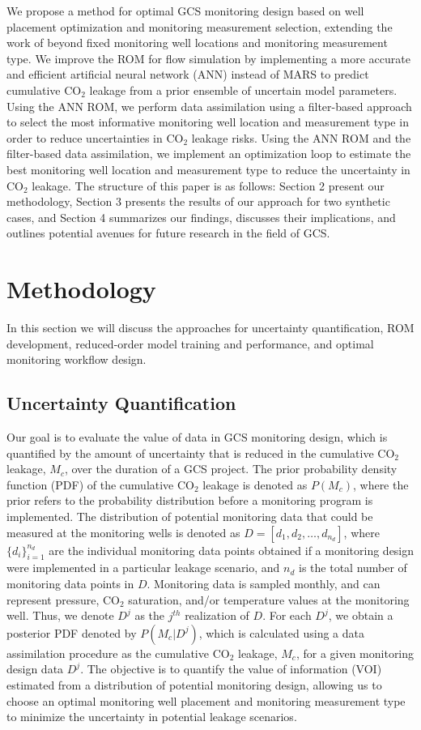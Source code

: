 \documentclass[a4paper,fleqn]{cas-sc}
\begin{document}
We propose a method for optimal GCS monitoring design based on well placement optimization and monitoring measurement selection, extending the work of \citet{Chen2018} beyond fixed monitoring well locations and monitoring measurement type. We improve the ROM for flow simulation by implementing a more accurate and efficient artificial neural network (ANN) instead of MARS to predict cumulative CO$_2$ leakage from a prior ensemble of uncertain model parameters. Using the ANN ROM, we perform data assimilation using a filter-based approach to select the most informative monitoring well location and measurement type in order to reduce uncertainties in CO$_2$ leakage risks. Using the ANN ROM and the filter-based data assimilation, we implement an optimization loop to estimate the best monitoring well location and measurement type to reduce the uncertainty in CO$_2$ leakage. The structure of this paper is as follows: Section 2 present our methodology, Section 3 presents the results of our approach for two synthetic cases, and Section 4 summarizes our findings, discusses their implications, and outlines potential avenues for future research in the field of GCS.

\section{Methodology}
In this section we will discuss the approaches for uncertainty quantification, ROM development, reduced-order model training and performance, and optimal monitoring workflow design.

\subsection{Uncertainty Quantification}
Our goal is to evaluate the value of data in GCS monitoring design, which is quantified by the amount of uncertainty that is reduced in the cumulative CO$_2$ leakage, $M_c$, over the duration of a GCS project. The prior probability density function (PDF) of the cumulative CO$_2$ leakage is denoted as $P(M_c)$, where the prior refers to the probability distribution before a monitoring program is implemented. The distribution of potential monitoring data that could be measured at the monitoring wells is denoted as $D=[d_1,d_2,\ldots,d_{n_d}]$, where $\{d_i\}_{i=1}^{n_d}$ are the individual monitoring data points obtained if a monitoring design were implemented in a particular leakage scenario, and $n_d$ is the total number of monitoring data points in $D$. Monitoring data is sampled monthly, and can represent pressure, CO$_2$ saturation, and/or temperature values at the monitoring well. Thus, we denote $D^j$ as the $j^{th}$ realization of $D$. For each $D^j$, we obtain a posterior PDF denoted by $P(M_c \vert D^j)$, which is calculated using a data assimilation procedure as the cumulative CO$_2$ leakage, $M_c$, for a given monitoring design data $D^j$. The objective is to quantify the value of information (VOI) estimated from a distribution of potential monitoring design, allowing us to choose an optimal monitoring well placement and monitoring measurement type to minimize the uncertainty in potential leakage scenarios.
\end{document}
